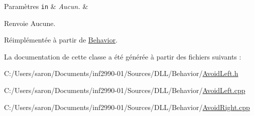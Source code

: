 \begin{DoxyParams}[1]{Paramètres}
\mbox{\tt in}  & {\em Aucun.} & \\
\hline
\end{DoxyParams}
\begin{DoxyReturn}{Renvoie}
Aucune. 
\end{DoxyReturn}


Réimplémentée à partir de \hyperlink{group__inf2990_gac22f205bc85075ff707ad1f695c18439}{Behavior}.



La documentation de cette classe a été générée à partir des fichiers suivants \-:\begin{DoxyCompactItemize}
\item 
C\-:/\-Users/saron/\-Documents/inf2990-\/01/\-Sources/\-D\-L\-L/\-Behavior/\hyperlink{_avoid_left_8h}{Avoid\-Left.\-h}\item 
C\-:/\-Users/saron/\-Documents/inf2990-\/01/\-Sources/\-D\-L\-L/\-Behavior/\hyperlink{_avoid_left_8cpp}{Avoid\-Left.\-cpp}\item 
C\-:/\-Users/saron/\-Documents/inf2990-\/01/\-Sources/\-D\-L\-L/\-Behavior/\hyperlink{_avoid_right_8cpp}{Avoid\-Right.\-cpp}\end{DoxyCompactItemize}
